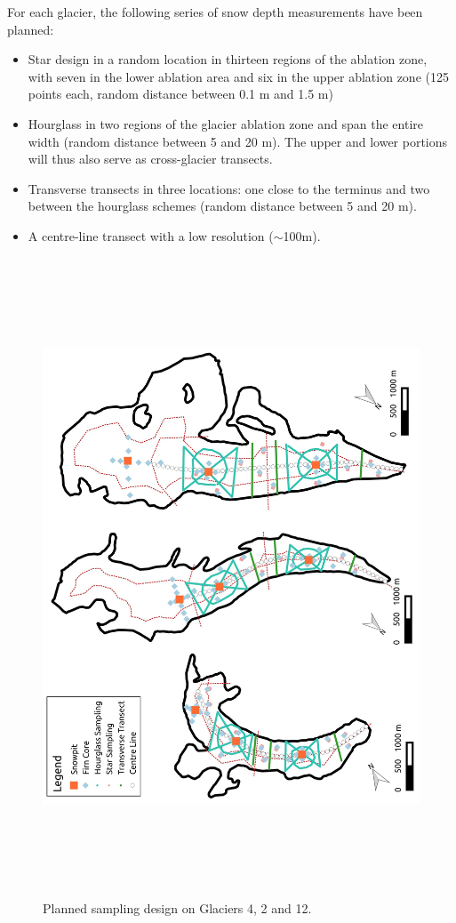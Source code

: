 \documentclass[12pt]{article}
\begin{document}
For each glacier, the following series of snow depth measurements have been planned:
\begin{itemize}
\item Star design in a random location in thirteen regions of the ablation zone, with seven in the lower ablation area and six in the upper ablation zone (125 points each, random distance between 0.1 m and 1.5 m)
\item Hourglass in two regions of the glacier ablation zone and span the entire width (random distance between 5 and 20 m). The upper and lower portions will thus also serve as cross-glacier transects.
\item Transverse transects in three locations: one close to the terminus and two between the hourglass schemes (random distance between 5 and 20 m).
\item A centre-line transect with a low resolution ($\sim$100m). 
\end{itemize}

 \begin{figure}
           \includegraphics[height=19cm]{SamplingDesign.jpeg}
       \caption{Planned sampling design on Glaciers 4, 2 and 12.}
       \label{sampling}
\end{figure}
\end{document}
